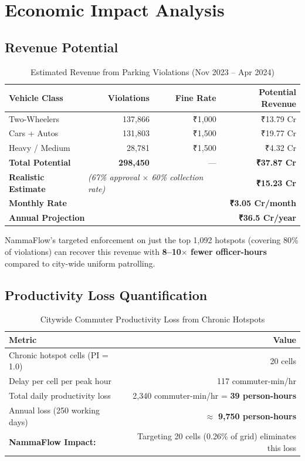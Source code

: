 \documentclass[12pt,a4paper]{article}
\begin{document}
\section{Economic Impact Analysis}

\subsection{Revenue Potential}

\begin{table}[H]
\centering
\caption{Estimated Revenue from Parking Violations (Nov 2023 -- Apr 2024)}
\begin{tabular}{lrrr}
\toprule
\textbf{Vehicle Class} & \textbf{Violations} & \textbf{Fine Rate} & \textbf{Potential Revenue} \\
\midrule
Two-Wheelers & 137,866 & ₹1,000 & ₹13.79 Cr \\
Cars + Autos & 131,803 & ₹1,500 & ₹19.77 Cr \\
Heavy / Medium & 28,781 & ₹1,500 & ₹4.32 Cr \\
\midrule
\rowcolor{emerald!10} \textbf{Total Potential} & \textbf{298,450} & — & \textbf{₹37.87 Cr} \\
\rowcolor{gold!10} \textbf{Realistic Estimate} & \multicolumn{2}{l}{\textit{(67\% approval $\times$ 60\% collection rate)}} & \textbf{₹15.23 Cr} \\
\midrule
\multicolumn{3}{l}{\textbf{Monthly Rate}} & \textbf{₹3.05 Cr/month} \\
\multicolumn{3}{l}{\textbf{Annual Projection}} & \textbf{₹36.5 Cr/year} \\
\bottomrule
\end{tabular}
\end{table}

NammaFlow's targeted enforcement on just the top 1,092 hotspots (covering 80\% of violations) can recover this revenue with \textbf{8--10$\times$ fewer officer-hours} compared to city-wide uniform patrolling.

\subsection{Productivity Loss Quantification}

\begin{table}[H]
\centering
\caption{Citywide Commuter Productivity Loss from Chronic Hotspots}
\begin{tabular}{lr}
\toprule
\textbf{Metric} & \textbf{Value} \\
\midrule
Chronic hotspot cells (PI = 1.0) & 20 cells \\
Delay per cell per peak hour & 117 commuter-min/hr \\
Total daily productivity loss & 2,340 commuter-min/hr = \textbf{39 person-hours} \\
Annual loss (250 working days) & $\approx$ \textbf{9,750 person-hours} \\
\midrule
\textbf{NammaFlow Impact:} & Targeting 20 cells (0.26\% of grid) eliminates this loss \\
\bottomrule
\end{tabular}
\end{table}
\end{document}
